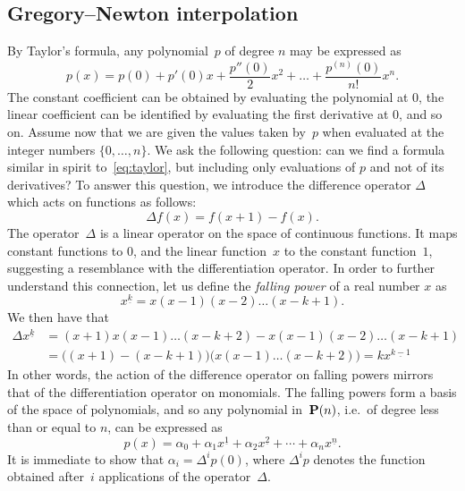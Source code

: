 \subsection{Gregory--Newton interpolation}
By Taylor's formula,
any polynomial~$p$ of degree $n$ may be expressed as
\begin{equation}
    \label{eq:taylor}
    p(x) = p(0) + p'(0) x + \frac{p''(0)}{2} x^2 + \dotsc + \frac{p^{(n)}(0)}{n!} x^n.
\end{equation}
The constant coefficient can be obtained by evaluating the polynomial at 0,
the linear coefficient can be identified by evaluating the first derivative at 0,
and so on.
Assume now that we are given the values taken by~$p$ when evaluated at the integer numbers $\{0, \dotsc, n\}$.
We ask the following question:
can we find a formula similar in spirit to~\eqref{eq:taylor},
but including only evaluations of $p$ and not of its derivatives?
To answer this question, we introduce the difference operator $\Delta$ which acts on functions as follows:
\[
    \Delta f(x) = f(x+1) - f(x).
\]
The operator~$\Delta$ is a linear operator on the space of continuous functions.
It maps constant functions to 0,
and the linear function~$x$ to the constant function~$1$,
suggesting a resemblance with the differentiation operator.
In order to further understand this connection,
let us define the \emph{falling power} of a real number $x$ as
\[
    x^{\underline{k}} = x (x-1) (x-2) \dots (x-k+1).
\]
We then have that
\begin{align}
    \nonumber
    \Delta x^{\underline{k}}
    &= (x+1) x (x-1) \dots (x-k+2) - x (x-1) (x-2) \dots (x-k+1) \\
    \label{eq:falling_powers_rule}
    &= \bigl((x+1) - (x-k+1)\bigr) \bigl(x (x-1) \dots (x-k+2)\bigr) = k x^{\underline{k-1}}
\end{align}
In other words,
the action of the difference operator on falling powers mirrors that of the differentiation operator on monomials.
The falling powers form a basis of the space of polynomials,
and so any polynomial in~$\mathbf P(n)$, i.e.\ of degree less than or equal to $n$, can be expressed as
\begin{equation}
    \label{eq:gregory_newton}
    p(x) = \alpha_0 + \alpha_1 x^{\underline{1}} + \alpha_2 x^{\underline{2}} + \dotsb + \alpha_n x^{\underline{n}}.
\end{equation}
It is immediate to show that $\alpha_i = \Delta^i p(0)$,
where $\Delta^i p$ denotes the function obtained after~$i$ applications of the operator~$\Delta$.
